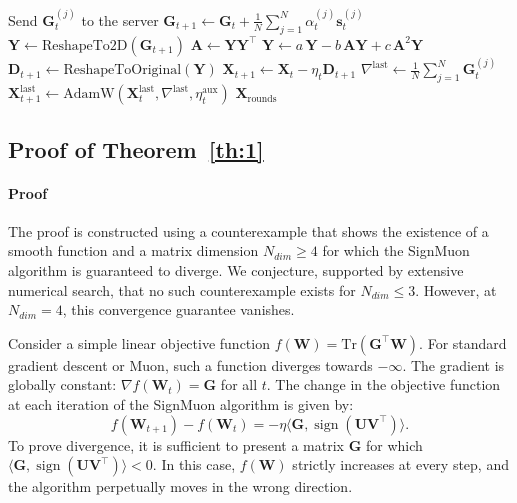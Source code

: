 \documentclass{article}
\begin{document}
\begin{algorithm}[H]
\begin{algorithmic}[1]
            \State Send $\mathbf{G}_t^{(j)}$ to the server
        \EndFor
    \EndFor
    \State $\mathbf{G}_{t+1} \gets \mathbf{G}_t + \frac{1}{N} \sum_{j=1}^N \alpha_t^{(j)} \mathbf{s}_t^{(j)}$ 
        \State $\mathbf{Y} \gets \text{ReshapeTo2D}(\mathbf{G}_{t+1})$
         
            \State $\mathbf{A} \gets \mathbf{Y} \mathbf{Y}^\top$
            \State $\mathbf{Y} \gets a\,\mathbf{Y} - b\,\mathbf{A}\mathbf{Y} + c\,\mathbf{A}^2\mathbf{Y}$
        \EndFor
        \State $\mathbf{D}_{t+1} \gets \text{ReshapeToOriginal}(\mathbf{Y})$
        \State $\mathbf{X}_{t+1} \gets \mathbf{X}_t - \eta_t \mathbf{D}_{t+1}$ 
    \EndFor
    \State $\nabla^{\text{last}} \gets \frac{1}{N} \sum_{j=1}^N \mathbf{G}_t^{(j)}$
    \State $\mathbf{X}_{t+1}^{\text{last}} \gets \text{AdamW}(\mathbf{X}_t^{\text{last}}, \nabla^{\text{last}}, \eta_t^{\text{aux}})$ 
\EndFor
\State \Return $\mathbf{X}_{\mathrm{rounds}}$
\label{ef21_alg}
\end{algorithmic}
\end{algorithm}

\newpage
\subsection{Proof of Theorem~\ref{th:1}}\label{app:proof_th1}

\paragraph{Proof} The proof is constructed using a counterexample that shows the existence of a smooth function and a matrix dimension $N_{dim} \ge 4$ for which the SignMuon algorithm is guaranteed to diverge. We conjecture, supported by extensive numerical search, that no such counterexample exists for $N_{dim}\le3$. However, at $N_{dim} = 4$, this convergence guarantee vanishes.

Consider a simple linear objective function $f(\mathbf{W}) = \mathrm{Tr}(\mathbf{G}^\top \mathbf{W})$. For standard gradient descent or Muon, such a function diverges towards $-\infty$. The gradient is globally constant: $\nabla f(\mathbf{W}_t) = \mathbf{G}$ for all $t$. The change in the objective function at each iteration of the SignMuon algorithm is given by:
\begin{equation}
f(\mathbf{W}_{t+1}) - f(\mathbf{W}_t) = -\eta \langle \mathbf{G}, \operatorname{sign}(\mathbf{U} \mathbf{V}^\top) \rangle.
\end{equation} 
To prove divergence, it is sufficient to present a matrix $\mathbf{G}$ for which $\langle \mathbf{G}, \operatorname{sign}(\mathbf{U} \mathbf{V}^\top) \rangle < 0$. In this case, $f(\mathbf{W})$ strictly increases at every step, and the algorithm perpetually moves in the wrong direction.
\end{document}
